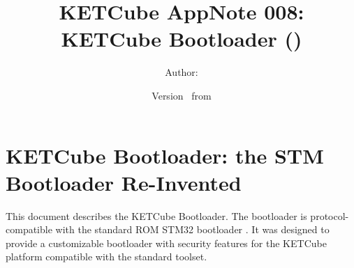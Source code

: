   




\title{\UWBLogo KETCube AppNote 008:\\ KETCube Bootloader (\vhCurrentVersion)}

\author{Author: \vhListAllAuthorsLongWithAbbrev}
\date{Version \vhCurrentVersion\ from \vhCurrentDate}

  




  


\section*{KETCube Bootloader: the STM Bootloader Re-Invented}


This document describes the KETCube Bootloader. The bootloader is protocol-compatible with the standard ROM STM32 bootloader \cite{STM32:AN3155}. It was designed to provide a customizable bootloader with security features for the KETCube platform compatible with the standard toolset.

\setcounter{tocdepth}{2}
\tableofcontents
\clearpage

\listoffigures
\listoftables
\begin{versionhistory}
\end{versionhistory}
\setcounter{table}{0}

